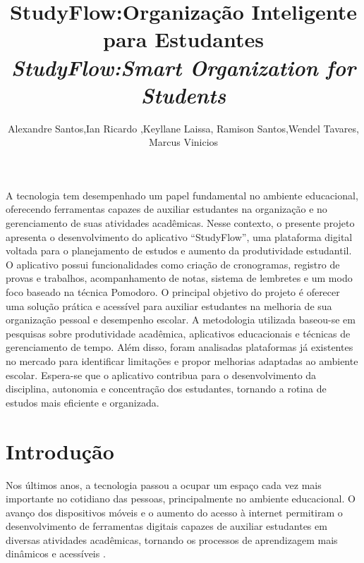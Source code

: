 \documentclass[12pt]{article}
\title{StudyFlow:Organização Inteligente para Estudantes \\
\medskip
\small{
    \textit{StudyFlow:Smart Organization for Students}
}
}
\author{Alexandre Santos\inst{},Ian Ricardo \inst{},Keyllane Laissa\inst{}, Ramison Santos\inst{},Wendel Tavares\inst{},\\Marcus Vinicios  }
\begin{document}
 

\maketitle

\thispagestyle{plain}




     
\begin{resumo} 
  \textbf{} A tecnologia tem desempenhado um papel fundamental no ambiente educacional, oferecendo ferramentas capazes de auxiliar estudantes na organização e no gerenciamento de suas atividades acadêmicas. Nesse contexto, o presente projeto apresenta o desenvolvimento do aplicativo “StudyFlow”, uma plataforma digital voltada para o planejamento de estudos e aumento da produtividade estudantil. O aplicativo possui funcionalidades como criação de cronogramas, registro de provas e trabalhos, acompanhamento de notas, sistema de lembretes e um modo foco baseado na técnica Pomodoro. O principal objetivo do projeto é oferecer uma solução prática e acessível para auxiliar estudantes na melhoria de sua organização pessoal e desempenho escolar. A metodologia utilizada baseou-se em pesquisas sobre produtividade acadêmica, aplicativos educacionais e técnicas de gerenciamento de tempo. Além disso, foram analisadas plataformas já existentes no mercado para identificar limitações e propor melhorias adaptadas ao ambiente escolar. Espera-se que o aplicativo contribua para o desenvolvimento da disciplina, autonomia e concentração dos estudantes, tornando a rotina de estudos mais eficiente e organizada. 
\end{resumo}



    
  \textbf{}


\section{Introdução}
Nos últimos anos, a tecnologia passou a ocupar um espaço cada vez mais importante no cotidiano das pessoas, principalmente no ambiente educacional. O avanço dos dispositivos móveis e o aumento do acesso à internet permitiram o desenvolvimento de ferramentas digitais capazes de auxiliar estudantes em diversas atividades acadêmicas, tornando os processos de aprendizagem mais dinâmicos e acessíveis .
\end{document}
